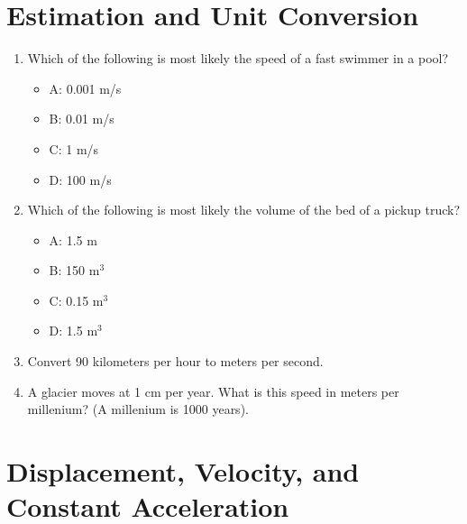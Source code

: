 \documentclass[10pt]{article}
\begin{document}
\maketitle

\section{Estimation and Unit Conversion}
\begin{enumerate}
\item Which of the following is most likely the speed of a fast swimmer in a pool?
\begin{itemize}
\item A: 0.001 m/s
\item B: 0.01 m/s
\item C: 1 m/s
\item D: 100 m/s
\end{itemize}
\item Which of the following is most likely the volume of the bed of a pickup truck?
\begin{itemize}
\item A: 1.5 m
\item B: 150 m$^3$
\item C: 0.15 m$^3$
\item D: 1.5 m$^3$
\end{itemize}
\item Convert 90 kilometers per hour to meters per second. \\ \vspace{1cm}
\item A glacier moves at 1 cm per year.  What is this speed in meters per millenium? (A millenium is 1000 years). \\ \vspace{2cm}
\end{enumerate}

\section{Displacement, Velocity, and Constant Acceleration}
\end{document}
